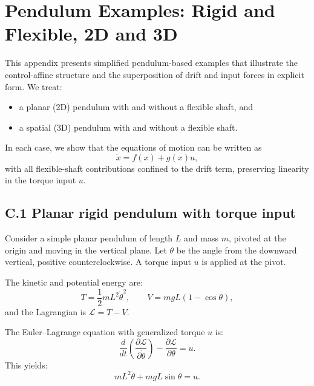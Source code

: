 \documentclass[12pt]{article}
\begin{document}
\section{Pendulum Examples: Rigid and Flexible, 2D and 3D}
\label{app:toy}

This appendix presents simplified pendulum-based examples that illustrate the control-affine structure and the superposition of drift and input forces in explicit form. We treat:
\begin{itemize}
  \item a planar (2D) pendulum with and without a flexible shaft, and
  \item a spatial (3D) pendulum with and without a flexible shaft.
\end{itemize}
In each case, we show that the equations of motion can be written as
\[
  \dot{x} = f(x) + g(x)u,
\]
with all flexible-shaft contributions confined to the drift term, preserving linearity in the torque input \(u\).

\subsection{C.1 \quad Planar rigid pendulum with torque input}

Consider a simple planar pendulum of length \(L\) and mass \(m\), pivoted at the origin and moving in the vertical plane. Let \(\theta\) be the angle from the downward vertical, positive counterclockwise. A torque input \(u\) is applied at the pivot.

The kinetic and potential energy are:
\[
  T = \frac{1}{2} m L^2 \dot{\theta}^2, \qquad
  V = m g L (1 - \cos\theta),
\]
and the Lagrangian is \( \mathcal{L} = T - V\).

The Euler--Lagrange equation with generalized torque \(u\) is:
\begin{equation}
  \frac{d}{dt}\left( \frac{\partial \mathcal{L}}{\partial \dot{\theta}} \right)
  - \frac{\partial \mathcal{L}}{\partial \theta}
  = u.
\end{equation}
This yields:
\begin{equation}
  m L^2 \ddot{\theta} + m g L \sin\theta = u.
  \label{eq:pendulum_planar}
\end{equation}
\end{document}
